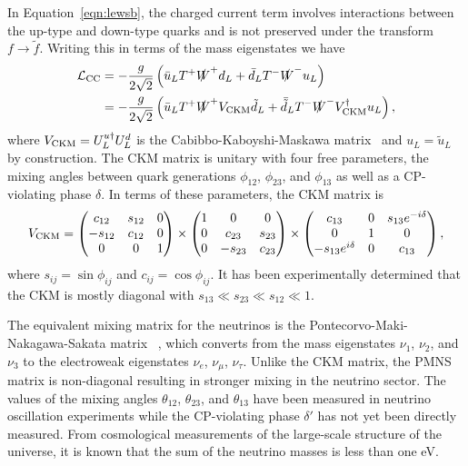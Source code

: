 In Equation~\ref{eqn:lewsb}, the charged current term involves interactions between the up-type and down-type quarks and is not preserved under the transform $f \rightarrow \tilde f$.
Writing this in terms of the mass eigenstates we have
\begin{align}
  \mathcal{L}_{\text{CC}} %
  & = - \frac{g}{2\sqrt{2}} \left( \bar u_L T^+ \slashed W^+ d_L + \bar d_L T^- \slashed W^- u_L \right) \nonumber \\
  & = - \frac{g}{2\sqrt{2}} \left( \bar{u}_L  T^+ \slashed W^+ \vckm \tilde{d}_L + \bar{\tilde{d}}_L T^- \slashed W^- \vckm^\dagger u_L \right),
\end{align}
where $V_{\text{CKM}} = U^{u\dagger}_L U^d_L$ is the Cabibbo-Kaboyshi-Maskawa matrix~\cite{Cabibbo1963, Maskawa1973} and $u_L = \tilde{u}_L$ by construction.
The CKM matrix is unitary with four free parameters, the mixing angles between quark generations $\phi_{12}$, $\phi_{23}$, and $\phi_{13}$ as well as a CP-violating phase $\delta$.
In terms of these parameters, the CKM matrix is
\begin{equation}
  V_{\text{CKM}} = \begin{pmatrix} c_{12} & s_{12} & 0 \\ - s_{12} & c_{12} & 0 \\ 0 & 0 & 1 \end{pmatrix}
  \times \begin{pmatrix} 1 & 0 & 0  \\ 0 & c_{23} & s_{23} \\ 0 & - s_{23} & c_{23} \end{pmatrix}
  \times \begin{pmatrix} c_{13} & 0 & s_{13} e^{-i\delta} \\ 0 & 1 & 0 \\ -s_{13} e^{i\delta} & 0 & c_{13} \end{pmatrix},
\end{equation}
where $s_{ij} = \sin \phi_{ij}$ and $c_{ij} = \cos \phi_{ij}$.
It has been experimentally determined that the CKM is mostly diagonal with $s_{13} \ll s_{23} \ll s_{12} \ll 1$. 

The equivalent mixing matrix for the neutrinos is the Pontecorvo-Maki-Nakagawa-Sakata matrix \upmns~\cite{Pontecorvo1957, Pontecorvo1967, Maki1962}, which  converts from the mass eigenstates $\nu_1$, $\nu_2$, and $\nu_3$ to the electroweak eigenstates $\nu_e$, $\nu_\mu$, $\nu_\tau$.
Unlike the CKM matrix, the PMNS matrix is non-diagonal resulting in stronger mixing in the neutrino sector.
The values of the mixing angles $\theta_{12}$, $\theta_{23}$, and $\theta_{13}$ have been measured in neutrino oscillation experiments while the CP-violating phase $\delta'$ has not yet been directly measured.
From cosmological measurements of the large-scale structure of the universe,
it is known that the sum of the neutrino masses is less than one eV. 


